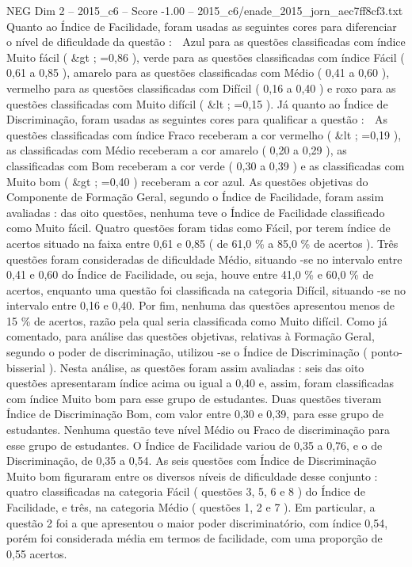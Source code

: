 \begin{textsample}{NEG Dim 2 – 2015\_c6 – Score -1.00 – 2015\_c6/enade\_2015\_jorn\_aec7ff8cf3.txt}
Quanto ao Índice de Facilidade, foram usadas as seguintes cores para diferenciar o nível de dificuldade da questão :  Azul para as questões classificadas com índice Muito fácil ( \&gt ; =0,86 ), verde para as questões classificadas com índice Fácil ( 0,61 a 0,85 ), amarelo para as questões classificadas com Médio ( 0,41 a 0,60 ), vermelho para as questões classificadas com Difícil ( 0,16 a 0,40 ) e roxo para as questões classificadas com Muito difícil ( \&lt ; =0,15 ).
Já quanto ao Índice de Discriminação, foram usadas as seguintes cores para qualificar a questão :  As questões classificadas com índice Fraco receberam a cor vermelho ( \&lt ; =0,19 ), as classificadas com Médio receberam a cor amarelo ( 0,20 a 0,29 ), as classificadas com Bom receberam a cor verde ( 0,30 a 0,39 ) e as classificadas com Muito bom ( \&gt ; =0,40 ) receberam a cor azul.
As questões objetivas do Componente de Formação Geral, segundo o Índice de Facilidade, foram assim avaliadas : das oito questões, nenhuma teve o Índice de Facilidade classificado como Muito fácil.
Quatro questões foram tidas como Fácil, por terem índice de acertos situado na faixa entre 0,61 e 0,85 ( de 61,0 \% a 85,0 \% de acertos ).
Três questões foram consideradas de dificuldade Médio, situando -se no intervalo entre 0,41 e 0,60 do Índice de Facilidade, ou seja, houve entre 41,0 \% e 60,0 \% de acertos, enquanto uma questão foi classificada na categoria Difícil, situando -se no intervalo entre 0,16 e 0,40.
Por fim, nenhuma das questões apresentou menos de 15 \% de acertos, razão pela qual seria classificada como Muito difícil.
Como já comentado, para análise das questões objetivas, relativas à Formação Geral, segundo o poder de discriminação, utilizou -se o Índice de Discriminação ( ponto- bisserial ).
Nesta análise, as questões foram assim avaliadas : seis das oito questões apresentaram índice acima ou igual a 0,40 e, assim, foram classificadas com índice Muito bom para esse grupo de estudantes.
Duas questões tiveram Índice de Discriminação Bom, com valor entre 0,30 e 0,39, para esse grupo de estudantes.
Nenhuma questão teve nível Médio ou Fraco de discriminação para esse grupo de estudantes.
O Índice de Facilidade variou de 0,35 a 0,76, e o de Discriminação, de 0,35 a 0,54.
As seis questões com Índice de Discriminação Muito bom figuraram entre os diversos níveis de dificuldade desse conjunto : quatro classificadas na categoria Fácil ( questões 3, 5, 6 e 8 ) do Índice de Facilidade, e três, na categoria Médio ( questões 1, 2 e 7 ).
Em particular, a questão 2 foi a que apresentou o maior poder discriminatório, com índice 0,54, porém foi considerada média em termos de facilidade, com uma proporção de 0,55 acertos.

\end{textsample}
